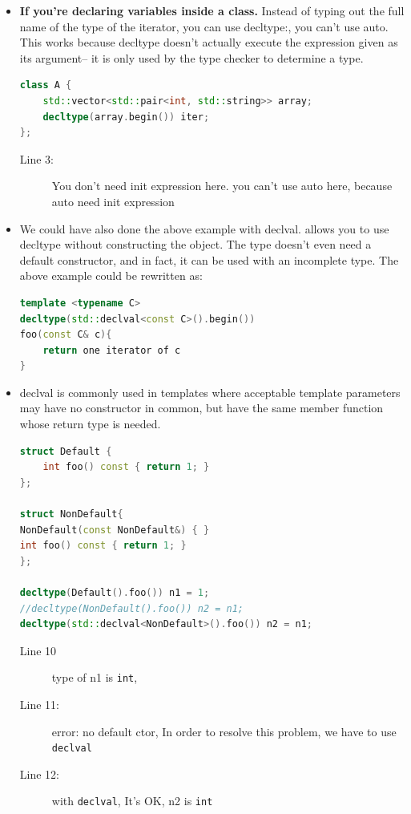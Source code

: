 \documentclass[a4paper,11pt,twoside]{book}
\begin{document}
\begin{itemize}
	\item  \textbf{If you're declaring variables inside a class.} Instead of typing out the full name of the type of the iterator, you can use decltype:, you can't use auto.  This works because decltype doesn't actually execute the expression given as its argument-- it is only used by the type checker to determine a type.
\begin{lstlisting}[frame=single, language=c++, mathescape=true]
class A {
	std::vector<std::pair<int, std::string>> array;
	decltype(array.begin()) iter; 
};
\end{lstlisting}
\begin{description}
	\item[Line 3:] You don't need init expression here. you can't use auto here, because auto need init expression
\end{description}
	
	\item We could have also done the above example with declval. allows you to use decltype without constructing the object. The type doesn't even need a default constructor, and in fact, it can be used with an incomplete type. The above example could be rewritten as:
	
\begin{lstlisting}[frame=single, language=c++, mathescape=true]
template <typename C>
decltype(std::declval<const C>().begin())
foo(const C& c){
	return one iterator of c
}
\end{lstlisting}
	
	\item declval is commonly used in templates where acceptable template parameters may have no constructor in common, but have the same member function whose return type is needed.
	
\begin{lstlisting}[frame=single, language=c++]
struct Default {
	int foo() const { return 1; } 
};

struct NonDefault{
NonDefault(const NonDefault&) { }
int foo() const { return 1; }
};
	
decltype(Default().foo()) n1 = 1;   
//decltype(NonDefault().foo()) n2 = n1;  
decltype(std::declval<NonDefault>().foo()) n2 = n1;
\end{lstlisting}
\begin{description}
	\item[Line 10 ]  type of n1 is \texttt{int}, 
	\item[Line 11:]  error: no default ctor, In order to resolve this problem, we have to use \texttt{declval}
	\item[Line 12:] with \texttt{declval}, It's OK, n2 is \texttt{int}
\end{description}
	

\end{itemize}
\end{document}

